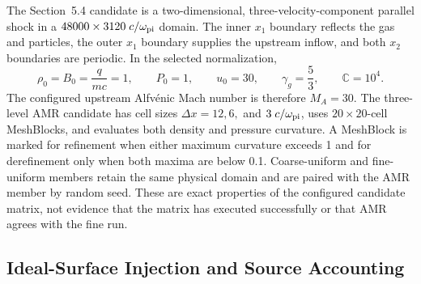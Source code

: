 \documentclass[twocolumn]{aastex701}
\begin{document}
The Section~5.4 candidate is a two-dimensional, three-velocity-component
parallel shock in a $48000\times3120\;c/\omega_{\rm pi}$ domain. The inner
$x_1$ boundary reflects the gas and particles, the outer $x_1$ boundary
supplies the upstream inflow, and both $x_2$ boundaries are periodic. In the
selected normalization,
\begin{equation}
\rho_0=B_0=\frac{q}{mc}=1,\qquad
P_0=1,\qquad
u_0=30,\qquad
\gamma_g=\frac{5}{3},\qquad
\mathbb{C}=10^4 .
\label{eq:shock-normalization}
\end{equation}
The configured upstream Alfv\'enic Mach number is therefore $M_A=30$. The
three-level AMR candidate has cell sizes
$\Delta x=12,6,$ and $3\;c/\omega_{\rm pi}$, uses $20\times20$-cell
MeshBlocks, and evaluates both density and pressure curvature. A MeshBlock is
marked for refinement when either maximum curvature exceeds 1 and for
derefinement only when both maxima are below 0.1. Coarse-uniform and
fine-uniform members retain the same physical domain and are paired with the
AMR member by random seed. These are exact properties of the configured
candidate matrix, not evidence that the matrix has executed successfully or
that AMR agrees with the fine run.

\subsection{Ideal-Surface Injection and Source Accounting}
\label{sec:shock-injection}
\end{document}
